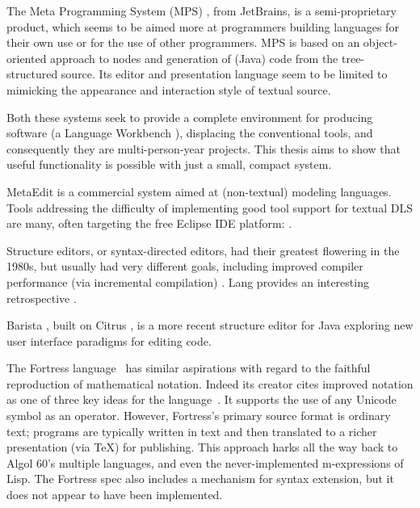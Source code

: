 The Meta Programming System (MPS) \cite{mps}, from JetBrains, is a semi-proprietary product, which seems to be aimed more at programmers building languages for their own use or for the use of other programmers. MPS is based on an object-oriented approach to nodes and generation of (Java) code from the tree-structured source. Its editor and presentation language seem to be limited to mimicking the appearance and interaction style of textual source.

Both these systems seek to provide a complete environment for producing software (a Language Workbench \cite{workbench}), displacing the conventional tools, and consequently they are multi-person-year projects. This thesis aims to show that useful functionality is possible with just a small, compact system.

MetaEdit \cite{metaedit} is a commercial system aimed at (non-textual) modeling languages. Tools addressing the difficulty of implementing good tool support for textual DLS are many, often targeting the free Eclipse IDE platform: \cite{xtext}\cite{spoofax}\cite{stratego}. 

Structure editors, or syntax-directed editors, had their greatest flowering in the 1980s, but usually had very different goals, including improved compiler performance (via incremental compilation) \cite{cps}\cite{zavodnik}. Lang provides an interesting retrospective \cite{lang}.

Barista \cite{barista}, built on Citrus \cite{citrus}, is a more recent structure editor for Java exploring new user interface paradigms for editing code.

The Fortress language~\cite{fortress} has similar aspirations with regard to the faithful reproduction of mathematical notation. Indeed its creator cites improved notation as one of three key ideas for the language~\cite{fortress-parallel}. It supports the use of any Unicode~\cite{unicode} symbol as an operator. However, Fortress's primary source format is ordinary text; programs are typically written in text and then translated to a richer presentation (via \TeX) for publishing. This approach harks all the way back to Algol 60's multiple languages, and even the never-implemented m-expressions of Lisp. The Fortress spec also includes a mechanism for syntax extension, but it does not appear to have been implemented.



